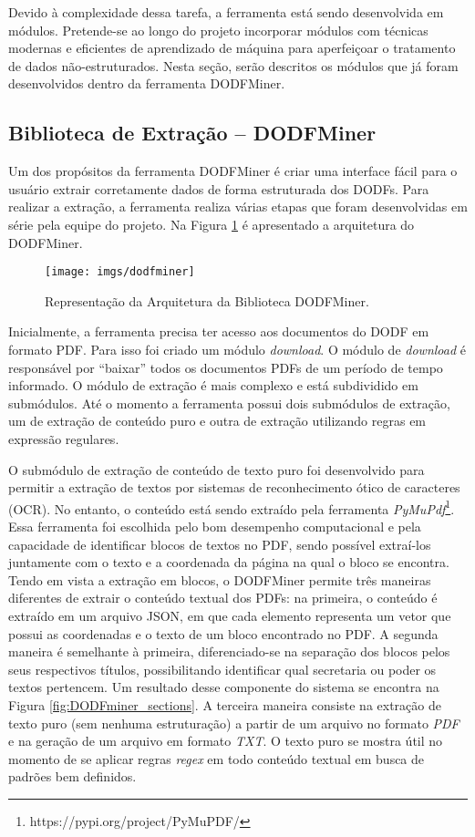 \documentclass[12pt]{article}
\begin{document}
Devido à complexidade dessa tarefa, a ferramenta está sendo desenvolvida em módulos. Pretende-se ao longo do projeto incorporar módulos com técnicas modernas e eficientes de aprendizado de máquina para aperfeiçoar o tratamento de dados não-estruturados. Nesta seção, serão descritos os módulos que já foram desenvolvidos dentro da ferramenta DODFMiner.


\subsection{Biblioteca de Extração -- DODFMiner}

Um dos propósitos da ferramenta DODFMiner é criar uma interface fácil para o usuário extrair corretamente dados de forma estruturada dos DODFs. Para realizar a extração, a ferramenta realiza várias etapas que foram desenvolvidas em série pela equipe do projeto. Na Figura \ref{dodfminer} é apresentado a arquitetura do DODFMiner.

\begin{figure}[ht]
    \centering
    \texttt{[image: imgs/dodfminer]}
    \caption{Representação da Arquitetura da Biblioteca DODFMiner.}
    \label{dodfminer}
\end{figure}

Inicialmente, a ferramenta precisa ter acesso aos documentos do DODF em formato PDF. Para isso foi criado um módulo \emph{download}. O módulo de \emph{download} é responsável por ``baixar''  todos os documentos PDFs de um período de tempo informado. O módulo de extração é mais complexo e está subdividido em submódulos. Até o momento a ferramenta possui dois submódulos de extração, um de extração de conteúdo puro e outra de extração utilizando regras em expressão regulares. 

O submódulo de extração de conteúdo de texto puro foi desenvolvido para permitir a extração de textos por sistemas de reconhecimento ótico de caracteres (OCR). No entanto, o conteúdo está sendo extraído pela ferramenta \emph{PyMuPdf}\footnote{https://pypi.org/project/PyMuPDF/}. Essa ferramenta foi escolhida pelo bom desempenho computacional e pela capacidade de identificar blocos de textos no PDF, sendo possível extraí-los juntamente com o texto e a coordenada da página na qual o bloco se encontra. Tendo em vista a extração em blocos, o DODFMiner permite três maneiras diferentes de extrair o conteúdo textual dos PDFs: na primeira, o conteúdo é extraído em um arquivo JSON, em que cada elemento representa um vetor que possui as coordenadas e o texto de um bloco encontrado no PDF. A segunda maneira é semelhante à primeira, diferenciado-se na separação dos blocos pelos seus respectivos títulos, possibilitando identificar qual secretaria ou poder os textos pertencem.
Um resultado desse componente do sistema se encontra na Figura \ref{fig:DODFminer_sections}.
A terceira maneira consiste na extração de texto puro (sem nenhuma estruturação) a partir de um arquivo no formato \textit{PDF} e na geração de um arquivo em formato \textit{TXT}. O texto puro se mostra útil no momento de se aplicar regras \textit{regex} em todo conteúdo textual em busca de padrões bem definidos.
\end{document}

